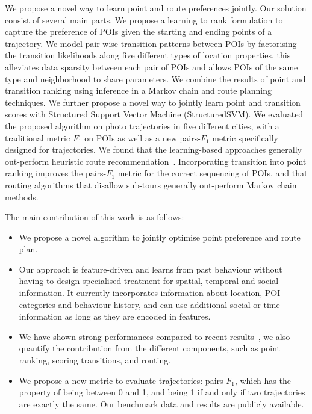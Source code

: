 We propose a novel way to learn point and route preferences jointly. 
Our solution consist of several main parts. 
We propose a learning to rank formulation to capture the preference of POIs given the starting and ending points of a trajectory. We model pair-wise transition patterns between POIs by factorising the transition likelihoods along five different types of location properties, %
this alleviates data sparsity between each pair of POIs and allows POIs of the same type and neighborhood to share parameters.
We combine the results of point and transition ranking using inference in a Markov chain and route planning techniques. We further propose a novel way to jointly learn point and transition scores with Structured Support Vector Machine (StructuredSVM). We evaluated the proposed algorithm on photo trajectories in five different cities, with a traditional metric $F_1$ on POIs as well as a new pairs-$F_1$ metric specifically designed for trajectories. We found that the learning-based approaches generally out-perform heuristic route recommendation~\cite{ijcai15}. Incorporating transition into point ranking improves the pairs-$F_1$ metric for the correct sequencing of POIs, and that routing algorithms that disallow sub-tours generally out-perform Markov chain methods. 


The main contribution of this work is as follows: 
\begin{itemize}
\setlength{\itemsep}{-2pt}
\item We propose a novel algorithm to jointly optimise point preference and route plan.
\item Our approach is feature-driven and learns from past behaviour without having to design specialised treatment for spatial, temporal and social information. It currently incorporates information about location, POI categories and behaviour history, and can use additional social or time information as long as they are  encoded in features. 
\item We have shown strong performances compared to recent results~\cite{ijcai15}, we also quantify the contribution from the different components, such as point ranking, scoring transitions, and routing. 
\item We propose a new metric to evaluate trajectories: pairs-$F_1$, which has the property of being between 0 and 1, and being 1 if and only if two trajectories are exactly the same. Our benchmark data and results are publicly available.
\end{itemize}
